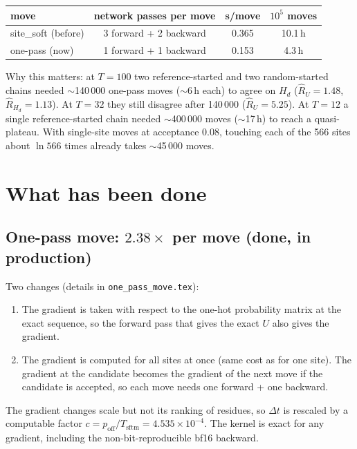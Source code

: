 \documentclass[11pt,a4paper]{article}
\newcommand{\dt}{\Delta t}
\newcommand{\Hd}{H_d}
\newcommand{\file}[1]{\texttt{#1}}
\begin{document}
\begin{center}
\begin{tabular}{lccc}
\toprule
move & network passes per move & s/move & $10^5$ moves \\
\midrule
site\_soft (before)  & 3 forward + 2 backward & 0.365 & 10.1\,h \\
one-pass (now)       & 1 forward + 1 backward & 0.153 & 4.3\,h \\
\bottomrule
\end{tabular}
\end{center}

\noindent
Why this matters: at $T=100$ two reference-started and two random-started
chains needed $\sim$140\,000 one-pass moves ($\sim$6\,h each) to agree on
$\Hd$ ($\hat R_U=1.48$, $\hat R_{\Hd}=1.13$). At $T=32$ they still disagree
after 140\,000 ($\hat R_U=5.25$). At $T=12$ a single reference-started chain
needed $\sim$400\,000 moves ($\sim$17\,h) to reach a quasi-plateau. With
single-site moves at acceptance 0.08, touching each of the 566 sites about
$\ln 566$ times already takes $\sim$45\,000 moves.

\section{What has been done}

\subsection{One-pass move: $2.38\times$ per move (done, in production)}

Two changes (details in \file{one\_pass\_move.tex}):
\begin{enumerate}
\item The gradient is taken with respect to the one-hot probability matrix at
  the exact sequence, so the forward pass that gives the exact $U$ also gives
  the gradient.
\item The gradient is computed for all sites at once (same cost as for one
  site). The gradient at the candidate becomes the gradient of the next move
  if the candidate is accepted, so each move needs one forward + one backward.
\end{enumerate}
The gradient changes scale but not its ranking of residues, so $\dt$ is
rescaled by a computable factor $c=p_{\mathrm{off}}/T_{\mathrm{sftm}}=
4.535\times10^{-4}$. The kernel is exact for any gradient, including the
non-bit-reproducible bf16 backward.
\end{document}
